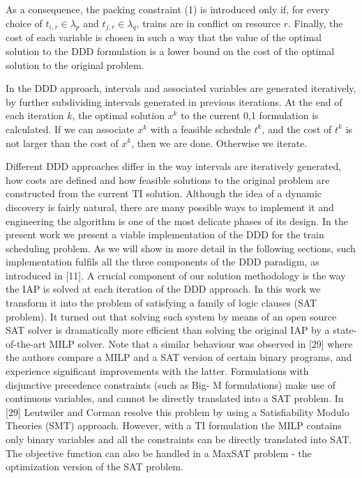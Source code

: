 \documentclass[10pt]{article}
\begin{document}
As a consequence, the packing constraint (1) is introduced only if, for every choice of $t_{i, r} \in \lambda_{p}$ and $t_{j, r} \in \lambda_{q}$, trains are in conflict on resource $r$. Finally, the cost of each variable is chosen in such a way that the value of the optimal solution to the DDD formulation is a lower bound on the cost of the optimal solution to the original problem.

In the DDD approach, intervals and associated variables are generated iteratively, by further subdividing intervals generated in previous iterations. At the end of each iteration $k$, the optimal solution $x^{k}$ to the current 0,1 formulation is calculated. If we can associate $x^{k}$ with a feasible schedule $t^{k}$, and the cost of $t^{k}$ is not larger than the cost of $x^{k}$, then we are done. Otherwise we iterate.

Different DDD approaches differ in the way intervals are iteratively generated, how costs are defined and how feasible solutions to the original problem are constructed from the current TI solution. Although the idea of a dynamic discovery is fairly natural, there are many possible ways to implement it and engineering the algorithm is one of the most delicate phases of its design. In the present work we present a viable implementation of the DDD for the train scheduling problem. As we will show in more detail in the following sections, such implementation fulfils all the three components of the DDD paradigm, as introduced in [11]. A crucial component of our solution methodology is the way the IAP is solved at each iteration of the DDD approach. In this work we transform it into the problem of satisfying a family of logic clauses (SAT problem). It turned out that solving such system by means of an open source SAT solver is dramatically more efficient than solving the original IAP by a state-of-the-art MILP solver. Note that a similar behaviour was observed in [29] where the authors compare a MILP and a SAT version of certain binary programs, and experience significant improvements with the latter. Formulations with disjunctive precedence constraints (such as Big- M formulations) make use of continuous variables, and cannot be directly translated into a SAT problem. In [29] Leutwiler and Corman resolve this problem by using a Satisfiability Modulo Theories (SMT) approach. However, with a TI formulation the MILP contains only binary variables and all the constraints can be directly translated into SAT. The objective function can also be handled in a MaxSAT problem - the optimization version of the SAT problem.
\end{document}
